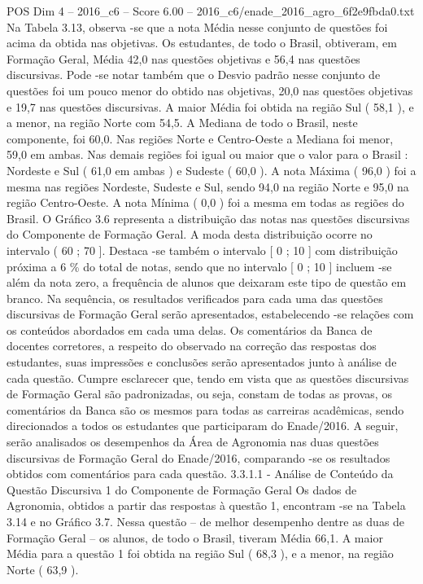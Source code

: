 \begin{textsample}{POS Dim 4 – 2016\_c6 – Score 6.00 – 2016\_c6/enade\_2016\_agro\_6f2e9fbda0.txt}
Na Tabela 3.13, observa -se que a nota Média nesse conjunto de questões foi acima da obtida nas objetivas.
Os estudantes, de todo o Brasil, obtiveram, em Formação Geral, Média 42,0 nas questões objetivas e 56,4 nas questões discursivas.
Pode -se notar também que o Desvio padrão nesse conjunto de questões foi um pouco menor do obtido nas objetivas, 20,0 nas questões objetivas e 19,7 nas questões discursivas.
A maior Média foi obtida na região Sul ( 58,1 ), e a menor, na região Norte com 54,5.
A Mediana de todo o Brasil, neste componente, foi 60,0.
Nas regiões Norte e Centro-Oeste a Mediana foi menor, 59,0 em ambas.
Nas demais regiões foi igual ou maior que o valor para o Brasil : Nordeste e Sul ( 61,0 em ambas ) e Sudeste ( 60,0 ).
A nota Máxima ( 96,0 ) foi a mesma nas regiões Nordeste, Sudeste e Sul, sendo 94,0 na região Norte e 95,0 na região Centro-Oeste.
A nota Mínima ( 0,0 ) foi a mesma em todas as regiões do Brasil.
O Gráfico 3.6 representa a distribuição das notas nas questões discursivas do Componente de Formação Geral.
A moda desta distribuição ocorre no intervalo ( 60 ; 70 ].
Destaca -se também o intervalo [ 0 ; 10 ] com distribuição próxima a 6 \% do total de notas, sendo que no intervalo [ 0 ; 10 ] incluem -se além da nota zero, a frequência de alunos que deixaram este tipo de questão em branco.
Na sequência, os resultados verificados para cada uma das questões discursivas de Formação Geral serão apresentados, estabelecendo -se relações com os conteúdos abordados em cada uma delas.
Os comentários da Banca de docentes corretores, a respeito do observado na correção das respostas dos estudantes, suas impressões e conclusões serão apresentados junto à análise de cada questão.
Cumpre esclarecer que, tendo em vista que as questões discursivas de Formação Geral são padronizadas, ou seja, constam de todas as provas, os comentários da Banca são os mesmos para todas as carreiras acadêmicas, sendo direcionados a todos os estudantes que participaram do Enade/2016.
A seguir, serão analisados os desempenhos da Área de Agronomia nas duas questões discursivas de Formação Geral do Enade/2016, comparando -se os resultados obtidos com comentários para cada questão. 3.3.1.1 - Análise de Conteúdo da Questão Discursiva 1 do Componente de Formação Geral Os dados de Agronomia, obtidos a partir das respostas à questão 1, encontram -se na Tabela 3.14 e no Gráfico 3.7.
Nessa questão – de melhor desempenho dentre as duas de Formação Geral – os alunos, de todo o Brasil, tiveram Média 66,1.
A maior Média para a questão 1 foi obtida na região Sul ( 68,3 ), e a menor, na região Norte ( 63,9 ).

\end{textsample}
